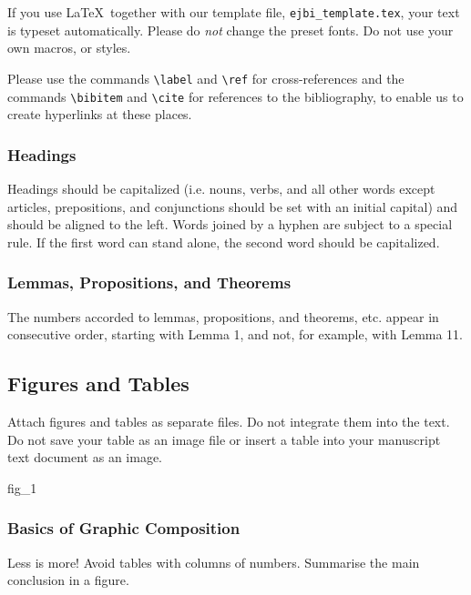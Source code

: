 \documentclass[a4paper,10pt,twocolumn,twoside,openright]{article}
\begin{document}
If you use \LaTeX\ together with our template file, \texttt{ejbi\_template.tex}, your text is typeset automatically. Please do \emph{not} change the preset fonts. Do not use your own macros, or styles.

Please use the commands \verb+\label+ and \verb+\ref+ for cross-references and the commands \verb+\bibitem+ and \verb+\cite+ for references to the bibliography, to enable us to create hyperlinks at these places.


\subsubsection*{Headings}

Headings should be capitalized (i.e. nouns, verbs, and all other words except articles, prepositions, and conjunctions should be set with an initial capital) and should be aligned to the left. Words joined by a hyphen are subject to a special rule. If the first word can stand alone, the second word should be capitalized.

\subsubsection*{Lemmas, Propositions, and Theorems}

The numbers accorded to lemmas, propositions, and theorems, etc. appear in consecutive order, starting with Lemma 1, and not, for example, with Lemma 11.

\subsection{Figures and Tables}

Attach figures and tables as separate files. Do not integrate them into the text. Do not save your table as an image file or insert a table into your manuscript text document as an image. 

\begin{ejbi-figure}{fig_1}
\caption{Construction, coding and use of GLIKREM}
\label{ex_fig}
\end{ejbi-figure}


\subsubsection*{Basics of Graphic Composition}

Less is more! Avoid tables with columns of numbers. Summarise the main conclusion in a figure. 
\end{document}
